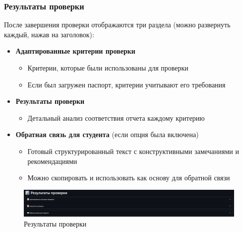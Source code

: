 \documentclass[a4paper,12pt]{article}
\begin{document}
\FloatBarrier
\begin{samepage}
\subsubsection{Результаты проверки}
После завершения проверки отображаются три раздела (можно развернуть каждый, нажав на заголовок):

\begin{itemize}
    \item \textbf{Адаптированные критерии проверки}
    \begin{itemize}
        \item Критерии, которые были использованы для проверки
        \item Если был загружен паспорт, критерии учитывают его требования
    \end{itemize}

    \item \textbf{Результаты проверки}
    \begin{itemize}
        \item Детальный анализ соответствия отчета каждому критерию
    \end{itemize}

    \item \textbf{Обратная связь для студента} (если опция была включена)
    \begin{itemize}
        \item Готовый структурированный текст с конструктивными замечаниями и рекомендациями
        \item Можно скопировать и использовать как основу для обратной связи
    \end{itemize}
\end{itemize}
\end{samepage}

\begin{figure}[!htb]
    \centering
    \includegraphics[width=\linewidth]{assets/check_results.png}
    \caption{Результаты проверки}
\end{figure}
\end{document}

